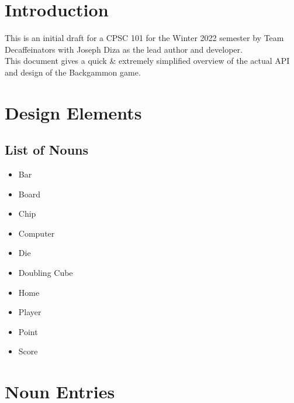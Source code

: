 \documentclass{report}
\begin{document}

\tableofcontents

\chapter{Introduction}

This is an initial draft for a CPSC 101 for the Winter 2022 semester by Team Decaffeinators
with Joseph Diza as the lead author and developer.  \\

\noindent
This document gives a quick \& extremely simplified overview
of the actual API and design of the Backgammon game.

\chapter{Design Elements}

\section{List of Nouns}

\begin{multicols}{2}
    \begin{itemize}
        \item Bar
        \item Board
        \item Chip
        \item Computer
        \item Die
    \end{itemize}

    \begin{itemize}
        \item Doubling Cube
        \item Home
        \item Player
        \item Point
        \item Score
    \end{itemize}
\end{multicols}

\chapter{Noun Entries}












\end{document}
